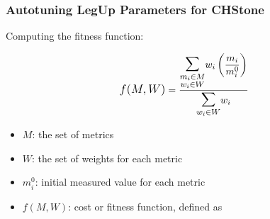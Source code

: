 \documentclass[10pt, compress, aspectratio=169, xcolor=table]{beamer}
\begin{document}
%
%

\begin{frame}
    \frametitle{Autotuning LegUp Parameters for CHStone}
    Computing the \alert{fitness function}:

    \begin{align*} \label{eq:wnsm}
        \mathlarger{f(M, W)} = \frac{\mathlarger{\mathlarger{\mathlarger{\sum}}}\limits_{\substack{m_i \in M \\ w_i \in W}}{w_i\left(\dfrac{m_i}{m_{i}^{0}}\right)}}{\mathlarger{\mathlarger{\mathlarger{\sum}}}\limits_{w_i \in W}{w_i}}
    \end{align*}

    \begin{itemize}
        \item $M$: the set of \alert{metrics}
        \item $W$: the set of \alert{weights for each metric}
        \item $m_{i}^{0}$: \alert{initial measured value} for each metric
        \item $f(M,W)$: \alert{cost} or \alert{fitness function}, defined as
    \end{itemize}
\end{frame}
\end{document}
